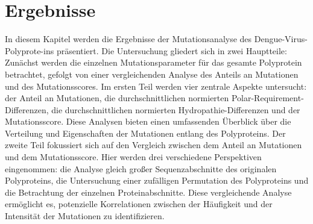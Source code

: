 \documentclass[german,version-2022-01]{uzl-thesis}
\begin{document}
\chapter{Ergebnisse}
In diesem Kapitel werden die Ergebnisse der Mutationsanalyse des Dengue-Virus-Polyprote-ins pr\"asentiert. Die Untersuchung gliedert sich in zwei Hauptteile: Zun\"achst werden die einzelnen Mutationsparameter f\"ur das gesamte Polyprotein betrachtet, gefolgt von einer vergleichenden Analyse des Anteils an Mutationen und des Mutationsscores. Im ersten Teil werden vier zentrale Aspekte untersucht: der Anteil an Mutationen, die durchschnittlichen normierten Polar-Requirement-Differenzen, die durchschnittlichen normierten Hydropathie-Differenzen und der Mutationsscore. Diese Analysen bieten einen umfassenden \"Uberblick \"uber die Verteilung und Eigenschaften der Mutationen entlang des Polyproteins. Der zweite Teil fokussiert sich auf den Vergleich zwischen dem Anteil an Mutationen und dem Mutationsscore. Hier werden drei verschiedene Perspektiven eingenommen: die Analyse gleich gro\ss{}er Sequenzabschnitte des originalen Polyproteins, die Untersuchung einer zuf\"alligen Permutation des Polyproteins und die Betrachtung der einzelnen Proteinabschnitte. Diese vergleichende Analyse erm\"oglicht es, potenzielle Korrelationen zwischen der H\"aufigkeit und der Intensit\"at der Mutationen zu identifizieren.
\end{document}
